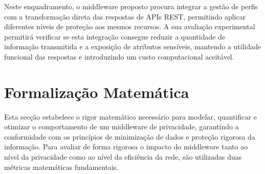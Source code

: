 \documentclass[12pt,reqno, twoside]{amsbook}
\theoremstyle{plain}
\numberwithin{equation}{chapter}
\numberwithin{table}{chapter}
\numberwithin{figure}{chapter}
\numberwithin{section}{chapter}
\begin{document}
Neste enquadramento, o middleware proposto procura integrar a gestão de perfis com a transformação direta das respostas de APIs REST, permitindo aplicar diferentes níveis de proteção aos mesmos recursos. A sua avaliação experimental permitirá verificar se esta integração consegue reduzir a quantidade de informação transmitida e a exposição de atributos sensíveis, mantendo a utilidade funcional das respostas e introduzindo um custo computacional aceitável.

\begin{table}[H]
\centering
\caption{Comparação dos modelos e trabalhos relacionados}
\label{tab}
\renewcommand{\arraystretch}{1.4}
\setlength{\tabcolsep}{3pt}
\scriptsize

\end{table}


\chapter{Formalização Matemática}
\noindent Esta secção estabelece o rigor matemático necessário para modelar, quantificar e otimizar o comportamento de um middleware de privacidade, garantindo a conformidade com os princípios de minimização de dados e proteção rigorosa da informação. Para avaliar de forma rigorosa o impacto do middleware tanto ao nível da privacidade como ao nível da eficiência da rede, são utilizadas duas métricas matemáticas fundamentais.
\end{document}
